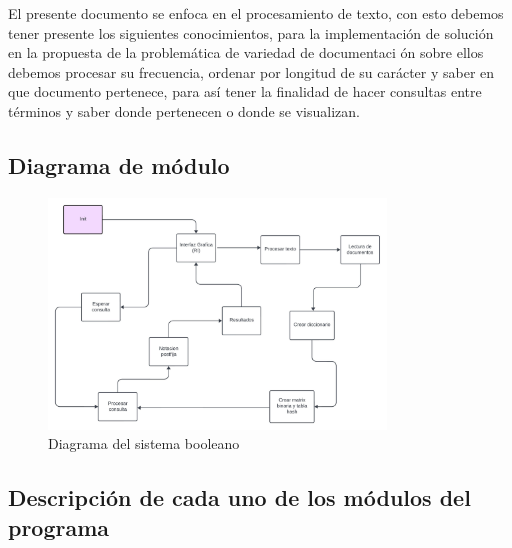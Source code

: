 El presente documento se enfoca en el procesamiento de texto, con esto debemos tener presente los siguientes
conocimientos, para la implementación de solución en la propuesta de la problemática de variedad de documentaci
ón sobre ellos debemos procesar su frecuencia, ordenar por longitud de su carácter y saber en que documento
pertenece, para así tener la finalidad de hacer consultas entre términos y saber donde pertenecen o donde se
visualizan.
\subsection{Diagrama de módulo}
\begin{figure}[ht]
  \centering
  \includegraphics[width=0.8\textwidth]{src/img/ejecucion/7.jpg}
  \caption{Diagrama del sistema booleano}
\end{figure}
\subsection{Descripción de cada uno de los módulos del programa}

